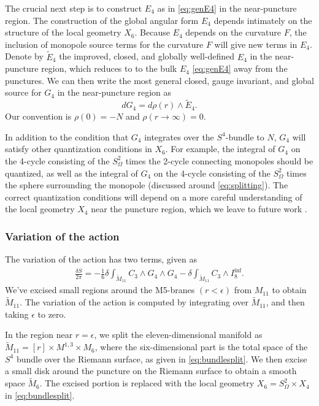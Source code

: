 \documentclass[a4paper,11pt]{article}
\newcommand{\ba}[1]{\begin{align} #1 \end{align} }
\begin{document}
The crucial next step is to construct ${E}_4$ as in  \eqref{eq:genE4} in the near-puncture region. The construction of the global angular form $E_4$ depends intimately on the structure of the local geometry $X_6$. Because $E_4$ depends on the curvature $F$, the inclusion of monopole source terms for the curvature $F$ will give new terms in $E_4$. Denote by $\widetilde{E}_4$ the improved, closed, and globally well-defined ${E}_4$ in the near-puncture region, which reduces to to the bulk $E_4$  \eqref{eq:genE4}  away from the punctures.
We can then write the most general closed, gauge invariant, and global source for $G_4$ in the near-puncture region as
\begin{equation}
d G_4 =  d \rho(r) \wedge \widetilde{E}_4. \label{eq:e4punct}
\end{equation}  Our convention is $\rho(0)=-N$ and $\rho(r\to\infty)=0$. 



In addition to the condition that $G_4$ integrates over the $S^4$-bundle to $N$, $G_4$ will satisfy other quantization conditions in $X_6$. For example, the integral of $G_4$ on the 4-cycle consisting of the $S^2_\Omega$ times the 2-cycle connecting monopoles should be quantized, as well as the integral of $G_4$ on the 4-cycle consisting of the $S^2_\Omega$ times the sphere surrounding the monopole (discussed around \eqref{eq:splitting}). The correct quantization conditions will depend on a more careful understanding of the local geometry $X_4$ near the puncture region, which we leave to future work \cite{Bah:2018bn}. 



\subsubsection*{Variation of the action}

The variation of the action has two terms, given as 
	\ba{
	\frac{\delta S}{2\pi}  =- \frac{1}{6} \delta  \int_{\widetilde{M}_{11}} {C}_3 \wedge {G}_4 \wedge {G}_4 {-} \delta \int_{\widetilde{M}_{11}} {C}_3 \wedge {I}_8^{\text{inf}}.\label{eq:totvar}
	}
We've excised small regions around the M5-branes $(r<\epsilon)$ from $M_{11}$ to obtain $\widetilde{M}_{11}$. The variation of the action is computed by integrating over $\widetilde{M}_{11}$, and then taking $\epsilon$ to zero. 

In the region near $r=\epsilon$, we split the eleven-dimensional manifold as $\widetilde{M}_{11}=[r]\times M^{1,3}\times {M}_{6}$, where the six-dimensional part is the total space of the $S^4$ bundle over the Riemann surface, as given in \eqref{eq:bundlesplit}. We then excise a small disk around the puncture on the Riemann surface to obtain a smooth space $\widetilde{M}_6$. The excised portion is replaced with the local geometry $X_6=S^2_\Omega\times X_4$ in  \eqref{eq:bundlesplit}. 
\end{document}
